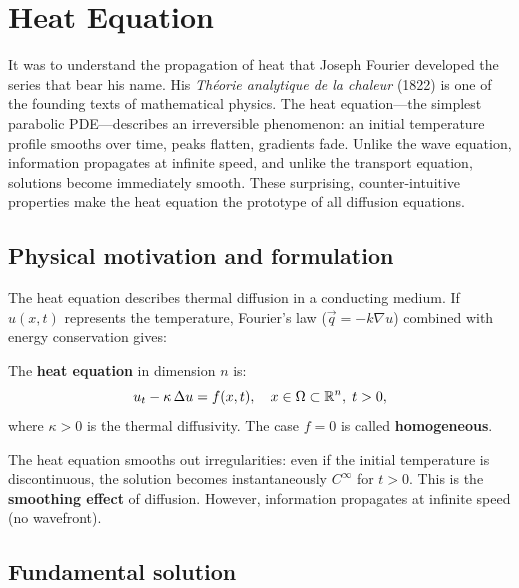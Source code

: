 \chapter{Heat Equation}
\label{ch:heat}

It was to understand the propagation of heat that Joseph Fourier developed the series that bear his name. His \emph{Th\'eorie analytique de la chaleur} (1822) is one of the founding texts of mathematical physics. The heat equation---the simplest parabolic PDE---describes an irreversible phenomenon: an initial temperature profile smooths over time, peaks flatten, gradients fade. Unlike the wave equation, information propagates at infinite speed, and unlike the transport equation, solutions become immediately smooth. These surprising, counter-intuitive properties make the heat equation the prototype of all diffusion equations.

\section{Physical motivation and formulation}

The heat equation describes thermal diffusion in a conducting medium.
If $u(x,t)$ represents the temperature, Fourier's law
($\vec{q} = -k\nabla u$) combined with energy conservation gives:

\begin{definition}
The \textbf{heat equation} in dimension $n$ is:
\begin{equation}\label{eq:heat}
    u_t - \kappa\, \Delta u = f(x,t), \quad x \in \Omega \subset \mathbb{R}^n,\; t > 0,
\end{equation}
where $\kappa > 0$ is the thermal diffusivity. The case $f = 0$ is called
\textbf{homogeneous}.
\end{definition}

\begin{intuition}
The heat equation smooths out irregularities: even if the initial
temperature is discontinuous, the solution becomes instantaneously
$C^\infty$ for $t > 0$. This is the \textbf{smoothing effect} of
diffusion. However, information propagates at infinite speed (no wavefront).
\end{intuition}

\section{Fundamental solution}

